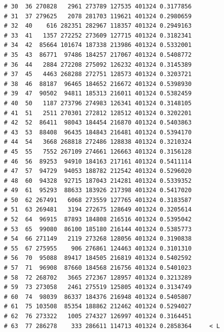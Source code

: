 \documentclass{article}\usepackage[]{graphicx}\usepackage[]{color}
\makeatletter
\newenvironment{kframe}{%
 \def\at@end@of@kframe{}%
 \ifinner\ifhmode%
  \def\at@end@of@kframe{\end{minipage}}%
  \begin{minipage}{\columnwidth}%
 \fi\fi%
 \def\FrameCommand##1{\hskip\@totalleftmargin \hskip-\fboxsep
 \colorbox{shadecolor}{##1}\hskip-\fboxsep
     \hskip-\linewidth \hskip-\@totalleftmargin \hskip\columnwidth}%
 \MakeFramed {\advance\hsize-\width
   \@totalleftmargin\z@ \linewidth\hsize
   \@setminipage}}%
 {\par\unskip\endMakeFramed%
 \at@end@of@kframe}
\newenvironment{knitrout}{}{} %
\makeatother
\begin{document}
\begin{knitrout}
\begin{kframe}
\begin{verbatim}
# 30  36 270828   2961 273789 127535 401324 0.3177856        
# 31  37 279625   2078 281703 119621 401324 0.2980659        
# 32  40    616 282351 282967 118357 401324 0.2949163        
# 33  41   1357 272252 273609 127715 401324 0.3182341        
# 34  42  85664 101674 187338 213986 401324 0.5332001        
# 35  43  86771  97486 184257 217067 401324 0.5408772        
# 36  44   2884 272208 275092 126232 401324 0.3145389        
# 37  45   4463 268288 272751 128573 401324 0.3203721        
# 38  46  88187  96465 184652 216672 401324 0.5398930        
# 39  47  90502  94811 185313 216011 401324 0.5382459        
# 40  50   1187 273796 274983 126341 401324 0.3148105        
# 41  51   2511 270301 272812 128512 401324 0.3202201        
# 42  52  86411  98043 184454 216870 401324 0.5403863        
# 43  53  88408  96435 184843 216481 401324 0.5394170        
# 44  54   3668 268818 272486 128838 401324 0.3210324        
# 45  55   7552 267109 274661 126663 401324 0.3156128        
# 46  56  89253  94910 184163 217161 401324 0.5411114        
# 47  57  94729  94053 188782 212542 401324 0.5296020        
# 48  60  94328  92715 187043 214281 401324 0.5339352        
# 49  61  95293  88633 183926 217398 401324 0.5417020        
# 50  62 267491   6068 273559 127765 401324 0.3183587        
# 51  63 269481   3194 272675 128649 401324 0.3205614        
# 52  64  96915  87893 184808 216516 401324 0.5395042        
# 53  65  99080  86100 185180 216144 401324 0.5385773        
# 54  66 271149   2119 273268 128056 401324 0.3190838        
# 55  67 275955    906 276861 124463 401324 0.3101310        
# 56  70  95088  89417 184505 216819 401324 0.5402592        
# 57  71  96908  87660 184568 216756 401324 0.5401023        
# 58  72 268702   3665 272367 128957 401324 0.3213289        
# 59  73 273058   2461 275519 125805 401324 0.3134749        
# 60  74  98039  86337 184376 216948 401324 0.5405807        
# 61  75 103508  85354 188862 212462 401324 0.5294027        
# 62  76 273322   1005 274327 126997 401324 0.3164451        
# 63  77 286278    333 286611 114713 401324 0.2858364     < L
\end{verbatim}
\end{kframe}
\end{knitrout}
\end{document}
